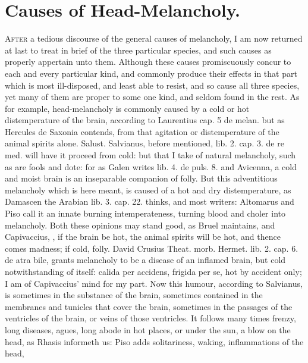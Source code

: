 {%
\section{Causes of Head-Melancholy.}

\lettrine{A}{fter} a tedious discourse of the general causes of melancholy, I am now
returned at last to treat in brief of the three particular species, and
such causes as properly appertain unto them. Although these causes
promiscuously concur to each and every particular kind, and commonly
produce their effects in that part which is most ill-disposed, and
least able to resist, and so cause all three species, yet many of them
are proper to some one kind, and seldom found in the rest. As for
example, head-melancholy is commonly caused by a cold or hot
distemperature of the brain, according to Laurentius \textlatin{cap. 5 de melan.}
but as Hercules de Saxonia contends, from that agitation or
distemperature of the animal spirits alone. Salust. Salvianus, before
mentioned, lib. 2. cap. 3. de re med. will have it proceed from cold:
but that I take of natural melancholy, such as are fools and dote: for
as Galen writes lib. 4. de puls. 8. and Avicenna, a cold and
moist brain is an inseparable companion of folly. But this adventitious
melancholy which is here meant, is caused of a hot and dry
distemperature, as Damascen the Arabian lib. 3. cap. 22. thinks,
and most writers: Altomarus and Piso call it an innate burning
intemperateness, turning blood and choler into melancholy. Both these
opinions may stand good, as Bruel maintains, and Capivaccius, , if the brain be hot, the animal spirits
will be hot, and thence comes madness; if cold, folly. David Crusius
Theat. morb. Hermet. lib. 2. cap. 6. de atra bile, grants melancholy to
be a disease of an inflamed brain, but cold notwithstanding of itself:
calida per accidens, frigida per se, hot by accident only; I am of
Capivaccius' mind for my part. Now this humour, according to Salvianus,
is sometimes in the substance of the brain, sometimes contained in the
membranes and tunicles that cover the brain, sometimes in the passages
of the ventricles of the brain, or veins of those ventricles. It
follows many times frenzy, long diseases, agues, long abode in
hot places, or under the sun, a blow on the head, as Rhasis informeth
us: Piso adds solitariness, waking, inflammations of the head,
}
